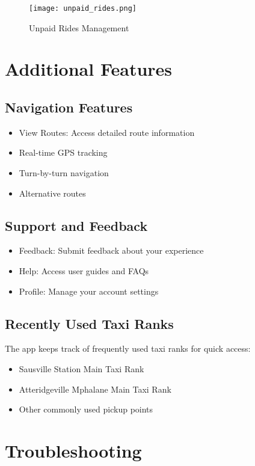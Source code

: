 \documentclass[12pt]{article}
\begin{document}
\begin{figure}[H]
  \centering
  \texttt{[image: unpaid\_rides.png]}
  \caption{Unpaid Rides Management}
\end{figure}

\section{Additional Features}

\subsection{Navigation Features}
\begin{itemize}
    \item View Routes: Access detailed route information
    \item Real-time GPS tracking
    \item Turn-by-turn navigation
    \item Alternative routes
\end{itemize}

\subsection{Support and Feedback}
\begin{itemize}
    \item Feedback: Submit feedback about your experience
    \item Help: Access user guides and FAQs
    \item Profile: Manage your account settings
\end{itemize}

\subsection{Recently Used Taxi Ranks}
The app keeps track of frequently used taxi ranks for quick access:
\begin{itemize}
    \item Sausville Station Main Taxi Rank
    \item Atteridgeville Mphalane Main Taxi Rank
    \item Other commonly used pickup points
\end{itemize}

\section{Troubleshooting}
\end{document}
